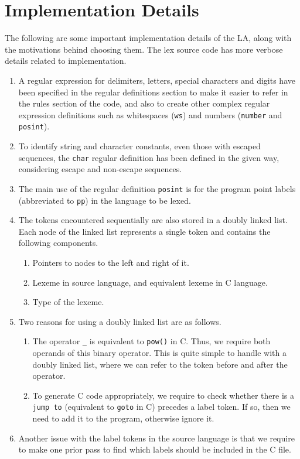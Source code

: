 \documentclass[journal,12pt,twocolumn]{IEEEtran}
\begin{document}
\section{Implementation Details}
The following are some important implementation details of the LA, along with
the motivations behind choosing them. The lex source code has more verbose
details related to implementation.
\begin{enumerate}
    \item A regular expression for delimiters, letters, special characters and
    digits have been specified in the regular definitions section to make it
    easier to refer in the rules section of the code, and also to create other
    complex regular expression definitions such as whitespaces (\texttt{ws}) and
    numbers (\texttt{number} and \texttt{posint}).
    \item To identify string and character constants, even those with escaped
    sequences, the \texttt{char} regular definition has been defined in the
    given way, considering escape and non-escape sequences.
    \item The main use of the regular definition \texttt{posint} is for the
    program point labels (abbreviated to \texttt{pp}) in the language to be
    lexed.
    \item The tokens encountered sequentially are also stored in a doubly linked
    list. Each node of the linked list represents a single token and contains
    the following components.
    \begin{enumerate}
        \item Pointers to nodes to the left and right of it.
        \item Lexeme in source language, and equivalent lexeme in C language.
        \item Type of the lexeme.
    \end{enumerate}
    \item Two reasons for using a doubly linked list are as follows.
    \begin{enumerate}
        \item The operator \texttt{\_} is equivalent to \texttt{pow()} in C.
        Thus, we require both operands of this binary operator. This is quite
        simple to handle with a doubly linked list, where we can refer to the
        token before and after the operator.
        \item To generate C code appropriately, we require to check whether
        there is a \texttt{jump to} (equivalent to \texttt{goto} in C) precedes
        a label token. If so, then we need to add it to the program, otherwise
        ignore it.
    \end{enumerate}
    \item Another issue with the label tokens in the source language is that we
    require to make one prior pass to find which labels should be included in
    the C file. 
    

\end{enumerate}
\end{document}
